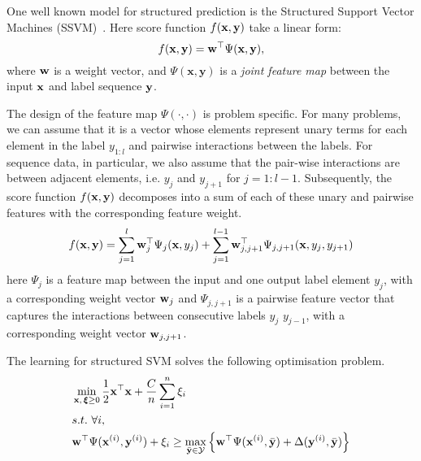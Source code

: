 One well known model for structured prediction is the Structured Support Vector Machines (SSVM)~\cite{joachims2009predicting,tsochantaridis2005large}. 
Here score function $f(\mathbf{x}, \mathbf{y})$ take a linear form:
\begin{equation*}
f(\mathbf{x}, \mathbf{y}) = \mathbf{w}^\top \Psi(\mathbf{x}, \mathbf{y}),
\end{equation*}
where $\mathbf{w}$ is a weight vector, and $\Psi(\mathbf{x}, \mathbf{y})$ is a \emph{joint feature map} 
between the input $\mathbf{x}$ and label sequence $\mathbf{y}$.

The design of the feature map $\Psi(\cdot,\cdot)$ is problem specific. 
For many problems, we can assume that it is a vector whose elements represent unary 
 terms for each element in the label $y_{1:l}$ and pairwise interactions between the labels. 
 For sequence data, in particular, we also assume that the pair-wise interactions are between 
 adjacent elements, i.e. $y_j$ and $y_{j+1}$ for $j=1:l-1$. 
 Subsequently, the score function $f(\mathbf{x},\mathbf{y})$ decomposes into a sum of 
 each of these unary and pairwise features with the corresponding feature weight.  
\begin{align}
\label{eq:jointfeature}
f(\x, \y) =  %
\sum_{j=1}^l \w_j^\top \Psi_j(\x, y_j)  
  + \sum_{j=1}^{l-1} \w_{j,j+1}^\top \Psi_{j,j+1}(\x, y_{j}, y_{j+1}) %
\end{align}
here $\Psi_j$ is a feature map between the input and one output label element $y_j$, with a corresponding weight vector $\mathbf{w}_j$
and $\Psi_{j,j+1}$ is a pairwise feature vector that captures the interactions between consecutive labels $y_j$ $y_{j-1}$, 
with a corresponding weight vector $\mathbf{w}_{j,j+1}$.

The learning for structured SVM solves the following optimisation problem.
\begin{align}
&\min_{\mathbf{x}, \, \bm{\xi} \ge 0} \frac{1}{2} \mathbf{x}^\top \mathbf{x} + \frac{C}{n} \sum_{i=1}^n \xi_i \label{eq:nslack}\\
&s.t.~  \forall i, \nonumber\\
&\mathbf{w}^\top \Psi(\mathbf{x}^{(i)}, \mathbf{y}^{(i)}) + \xi_i \ge
          \max_{\bar{\mathbf{y}} \in \mathcal{Y}}
          \left\{\mathbf{w}^\top \Psi(\mathbf{x}^{(i)}, \bar{\mathbf{y}}) + \Delta(\mathbf{y}^{(i)}, \bar{\mathbf{y}}) \right\} \nonumber
\end{align}

